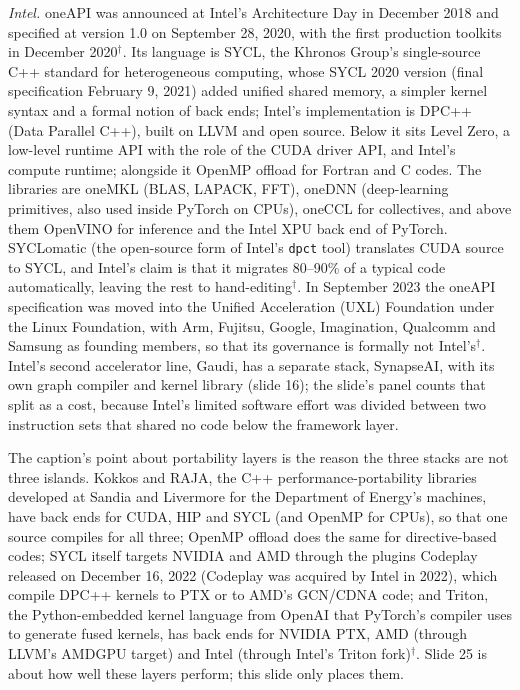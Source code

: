\documentclass[11pt,letterpaper]{article}
\begin{document}
\emph{Intel.} oneAPI was announced at Intel's Architecture Day in December 2018 and specified at version 1.0 on September 28, 2020, with the first production toolkits in December 2020$^\dagger$. Its language is SYCL, the Khronos Group's single-source C++ standard for heterogeneous computing, whose SYCL 2020 version (final specification February 9, 2021) added unified shared memory, a simpler kernel syntax and a formal notion of back ends; Intel's implementation is DPC++ (Data Parallel C++), built on LLVM and open source. Below it sits Level Zero, a low-level runtime API with the role of the CUDA driver API, and Intel's compute runtime; alongside it OpenMP offload for Fortran and C codes. The libraries are oneMKL (BLAS, LAPACK, FFT), oneDNN (deep-learning primitives, also used inside PyTorch on CPUs), oneCCL for collectives, and above them OpenVINO for inference and the Intel XPU back end of PyTorch. SYCLomatic (the open-source form of Intel's \texttt{dpct} tool) translates CUDA source to SYCL, and Intel's claim is that it migrates 80--90\% of a typical code automatically, leaving the rest to hand-editing$^\dagger$. In September 2023 the oneAPI specification was moved into the Unified Acceleration (UXL) Foundation under the Linux Foundation, with Arm, Fujitsu, Google, Imagination, Qualcomm and Samsung as founding members, so that its governance is formally not Intel's$^\dagger$. Intel's second accelerator line, Gaudi, has a separate stack, SynapseAI, with its own graph compiler and kernel library (slide 16); the slide's panel counts that split as a cost, because Intel's limited software effort was divided between two instruction sets that shared no code below the framework layer.

The caption's point about portability layers is the reason the three stacks are not three islands. Kokkos and RAJA, the C++ performance-portability libraries developed at Sandia and Livermore for the Department of Energy's machines, have back ends for CUDA, HIP and SYCL (and OpenMP for CPUs), so that one source compiles for all three; OpenMP offload does the same for directive-based codes; SYCL itself targets NVIDIA and AMD through the plugins Codeplay released on December 16, 2022 (Codeplay was acquired by Intel in 2022), which compile DPC++ kernels to PTX or to AMD's GCN/CDNA code; and Triton, the Python-embedded kernel language from OpenAI that PyTorch's compiler uses to generate fused kernels, has back ends for NVIDIA PTX, AMD (through LLVM's AMDGPU target) and Intel (through Intel's Triton fork)$^\dagger$. Slide 25 is about how well these layers perform; this slide only places them.
\end{document}
